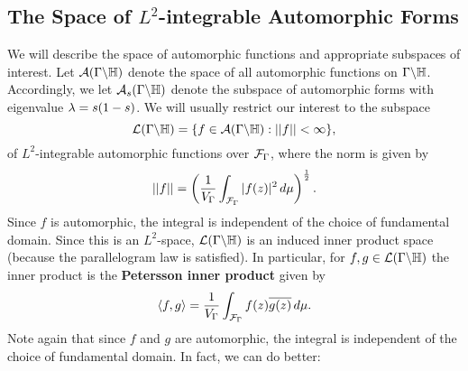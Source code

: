     \subsection*{The Space of \texorpdfstring{$L^{2}$}{L^{2}}-integrable Automorphic Forms}
      We will describe the space of automorphic functions and appropriate subspaces of interest. Let $\mathcal{A}(\Gamma\backslash\mathbb{H})$ denote the space of all automorphic functions on $\Gamma\backslash\mathbb{H}$. Accordingly, we let $\mathcal{A}_{s}(\Gamma\backslash\mathbb{H})$ denote the subspace of automorphic forms with eigenvalue $\lambda = s(1-s)$. We will usually restrict our interest to the subspace
      \[
        \mathcal{L}(\Gamma\backslash\mathbb{H}) = \{f \in \mathcal{A}(\Gamma\backslash\mathbb{H}):||f|| < \infty\},
      \]
      of $L^{2}$-integrable automorphic functions over $\mathcal{F}_{\Gamma}$, where the norm is given by
      \[
        ||f|| = \left(\frac{1}{V_{\Gamma}}\int_{\mathcal{F}_{\Gamma}}|f(z)|^{2}\,d\mu\right)^{\frac{1}{2}}.
      \]
      Since $f$ is automorphic, the integral is independent of the choice of fundamental domain. Since this is an $L^{2}$-space, $\mathcal{L}(\Gamma\backslash\mathbb{H})$ is an induced inner product space (because the parallelogram law is satisfied). In particular, for $f,g \in \mathcal{L}(\Gamma\backslash\mathbb{H})$ the inner product is the \textbf{Petersson inner product} given by
      \[
        \langle f,g\rangle = \frac{1}{V_{\Gamma}}\int_{\mathcal{F}_{\Gamma}}f(z)\overline{g(z)}\,d\mu.
      \]
      Note again that since $f$ and $g$ are automorphic, the integral is independent of the choice of fundamental domain. In fact, we can do better:

